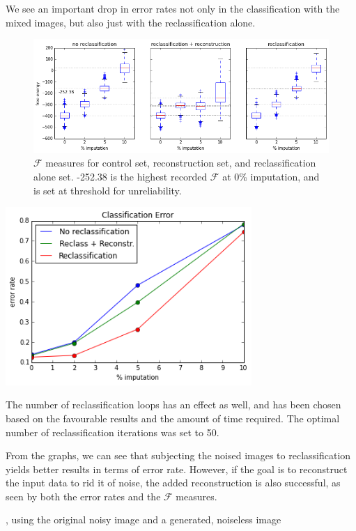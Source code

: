 \documentclass{report}
\begin{document}
We see an important drop in error rates not only in the classification with the mixed images, but also just with the reclassification alone.



\begin{figure}
	\includegraphics[width=\textwidth]{FE_boxplots}
	\caption{$\mathcal{F}$ measures for control set, reconstruction set, and reclassification alone set. -252.38 is the highest recorded $\mathcal{F}$ at 0\% imputation, and is set at threshold for unreliability.}
\end{figure}

\includegraphics[width=0.7\textwidth]{err_plot}

The number of reclassification loops has an effect as well, and has been chosen based on the favourable results and the amount of time required. The optimal number of reclassification iterations was set to 50.

From the graphs, we can see that subjecting the noised images to reclassification yields better results in terms of error rate. However, if the goal is to reconstruct the input data to rid it of noise, the added reconstruction is also successful, as seen by both the error rates and the $\mathcal{F}$ measures.

, using the original noisy image and a generated, noiseless image
\end{document}
